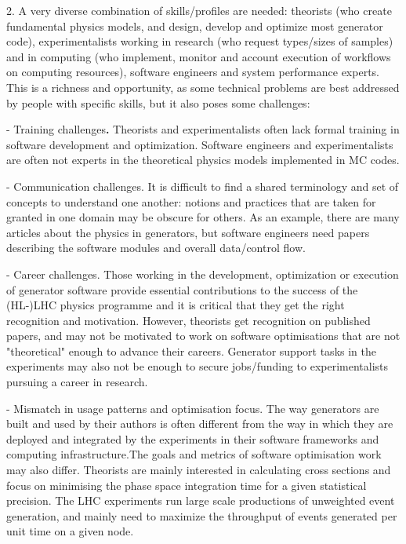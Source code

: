 \documentclass[11pt,a4paper]{article}
\begin{document}
2. {A very diverse combination of skills/profiles are needed}: theorists
(who create fundamental physics models, and design, develop and optimize
most generator code), experimentalists working in research (who request
types/sizes of samples) and in computing (who implement, monitor and
account execution of workflows on computing resources), software
engineers and system performance experts. This is a richness and
opportunity, as some technical problems are best addressed by people
with specific skills, but it also poses some challenges:

- {Training challenges}\textbf{.} Theorists and experimentalists often
lack formal training in software development and optimization. Software
engineers and experimentalists are often not experts in the theoretical
physics models implemented in MC codes.

- {Communication challenges}. It is difficult to find a shared
terminology and set of concepts to understand one another: notions and
practices that are taken for granted in one domain may be obscure for
others. As an example, there are many articles about the physics in
generators, but software engineers need papers describing the software
modules and overall data/control flow.

- {Career challenges}. Those working in the development, optimization or
execution of generator software provide essential contributions to the
success of the (HL-)LHC physics programme and it is critical that they
get the right recognition and motivation. However, theorists get
recognition on published papers, and may not be motivated to work on
software optimisations that are not "theoretical" enough to advance
their careers. Generator support tasks in the experiments may also not
be enough to secure jobs/funding to experimentalists pursuing a career
in research.

- {Mismatch in usage patterns and optimisation focus}. The way
generators are built and used by their authors is often different from
the way in which they are deployed and integrated by the experiments in
their software frameworks and computing infrastructure.The goals and
metrics of software optimisation work may also differ. Theorists are
mainly interested in calculating cross sections and focus on minimising
the phase space integration time for a given statistical precision. The
LHC experiments run large scale productions of unweighted event
generation, and mainly need to maximize the throughput of events
generated per unit time on a given node.
\end{document}
